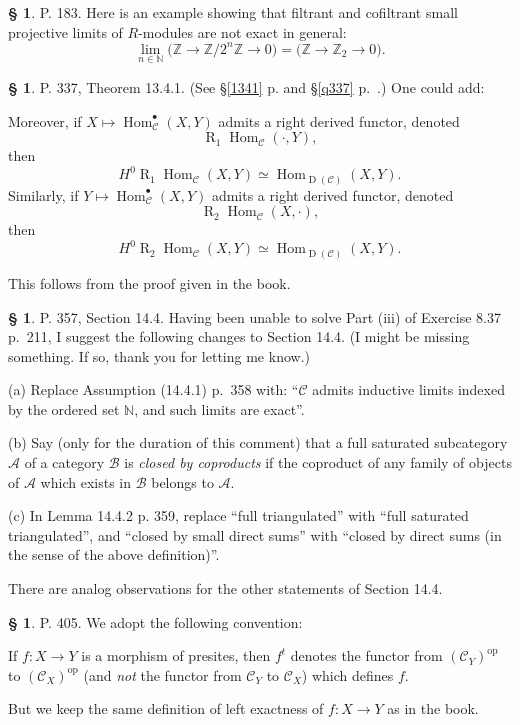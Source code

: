 \documentclass[12pt]{article}
\theoremstyle{remark}
\theoremstyle{definition}
\newtheorem{s}[thm]{\S}
\newcommand{\bu}{\bullet}
\newcommand{\bb}{\mathbb}
\newcommand{\A}{\mathcal A}
\newcommand{\B}{\mathcal B}
\newcommand{\C}{\mathcal C}
\newcommand{\oo}{\operatorname}
\DeclareMathOperator{\Hom}{Hom}%
\DeclareMathOperator{\op}{op}
\begin{document}
%
%
\begin{s}
P. 183. Here is an example showing that filtrant and cofiltrant small projective limits of $R$-modules are not exact in general: 
$$
\lim_{n\in\bb N}\big(\bb Z\to\bb Z/2^n\bb Z\to0\big)=\big(\bb Z\to\bb Z_2\to0\big).
$$
\end{s}
%
%
\begin{s}%
P. 337, Theorem 13.4.1. (See \S\ref{1341} p. \pageref{1341} and \S\ref{q337} p.~\pageref{q337}.) One could add:

Moreover, if $X\mapsto\Hom_\C^\bu(X,Y)$ admits a right derived functor, denoted 
$$
\oo R_1\Hom_\C(\cdot,Y),
$$ 
then 
$$
H^0\oo R_1\Hom_\C(X,Y)\simeq\Hom_{\oo D(\C)}(X,Y).
$$ 
Similarly, if $Y\mapsto\Hom_\C^\bu(X,Y)$ admits a right derived functor, denoted 
$$
\oo R_2\Hom_\C(X,\cdot),
$$ 
then 
$$
H^0\oo R_2\Hom_\C(X,Y)\simeq\Hom_{\oo D(\C)}(X,Y).
$$

This follows from the proof given in the book. 
\end{s}
%
%
\begin{s} 
P. 357, Section 14.4. Having been unable to solve Part (iii) of Exercise 8.37 p.~211, I suggest the following changes to Section 14.4. (I might be missing something. If so, thank you for letting me know.)

\noindent(a) Replace Assumption (14.4.1) p.~358 with: ``$\C$ admits inductive limits indexed by the ordered set $\bb N$, and such limits are exact''.

\noindent(b) Say (only for the duration of this comment) that a full saturated subcategory $\A$ of a category $\B$ is {\em closed by coproducts} if the coproduct of any family of objects of $\A$ which exists in $\B$ belongs to $\A$.

\noindent(c) In Lemma 14.4.2 p. 359, replace ``full triangulated'' with ``full saturated triangulated'', and ``closed by small direct sums'' with ``closed by direct sums (in the sense of the above definition)''. 

There are analog observations for the other statements of Section 14.4.
\end{s}
%
%
\begin{s}\label{revol}
P. 405. We adopt the following convention: 

If $f:X\to Y$ is a morphism of presites, then $f^t$ denotes the functor from $(\C_Y)^{\op}$ to $(\C_X)^{\op}$ (and {\em not} the functor from $\C_Y$ to $\C_X$) which defines $f$.

But we keep the same definition of left exactness of $f:X\to Y$ as in the book.
\end{s}
\end{document}
